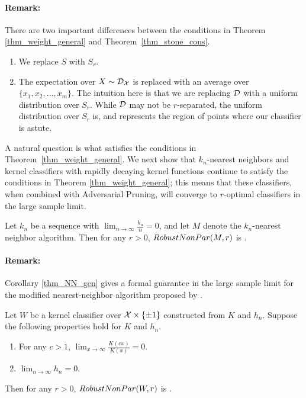 \paragraph{\textbf{Remark}:}
There are two important differences between the conditions in Theorem \ref{thm_weight_general} and Theorem~\ref{thm_stone_cons}.
\begin{enumerate}
	\item We replace $S$ with $S_r$.
	\item The expectation over $X \sim {\mathcal D}_\mathcal X$ is replaced with an average over $\{x_1, x_2, \dots, x_m\}$. The intuition here is that we are replacing ${\mathcal D}$ with a uniform distribution over $S_r$. While ${\mathcal D}$ may not be $r$-separated, the uniform distribution over $S_r$ is, and represents the region of points where our classifier is astute. 
\end{enumerate}

A natural question is what satisfies the conditions in Theorem~\ref{thm_weight_general}. We next show that $k_n$-nearest neighbors and kernel classifiers with rapidly decaying kernel functions continue to satisfy the conditions in Theorem \ref{thm_weight_general}; this means that these classifiers, when combined with Adversarial Pruning, will converge to $r$-optimal classifiers in the large sample limit.

\begin{cor}\label{thm_NN_gen}
Let $k_n$ be a sequence with $\lim_{n \to \infty} \frac{k_n}{n} = 0$, and let $M$ denote the $k_n$-nearest neighbor algorithm. Then for any $r > 0$, $RobustNonPar(M, r)$ is \rcons.
\end{cor}
\paragraph{\textbf{Remark}:} Corollary \ref{thm_NN_gen} gives a formal guarantee in the large sample limit for the modified nearest-neighbor algorithm proposed by \cite{YRWC19}.

\begin{cor}\label{thm_kern_gen}
Let $W$ be a kernel classifier over $\mathcal X \times \{\pm 1\}$ constructed from $K$ and $h_n$. Suppose the following properties hold for $K$ and $h_n$.
\begin{enumerate}
	\item For any $c > 1$, $\lim_{x \to \infty} \frac{K(cx)}{K(x)} = 0.$
	\item $\lim_{n \to \infty} h_n = 0.$
\end{enumerate}
Then for any $r > 0$, $RobustNonPar(W, r)$ is \rcons.
\end{cor}

